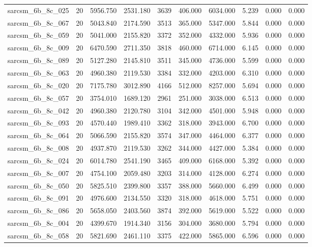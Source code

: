 \begin{tabular}{lrrrrrrrrr}
sarcsm\_6b\_8c\_025 & 20 & 5956.750 & 2531.180 & 3639 & 406.000 & 6034.000 & 5.239 & 0.000 & 0.000 \\
sarcsm\_6b\_8c\_067 & 20 & 5043.840 & 2174.590 & 3513 & 365.000 & 5347.000 & 5.844 & 0.000 & 0.000 \\
sarcsm\_6b\_8c\_059 & 20 & 5041.000 & 2155.820 & 3372 & 352.000 & 4332.000 & 5.936 & 0.000 & 0.000 \\
sarcsm\_6b\_8c\_009 & 20 & 6470.590 & 2711.350 & 3818 & 460.000 & 6714.000 & 6.145 & 0.000 & 0.000 \\
sarcsm\_6b\_8c\_089 & 20 & 5127.280 & 2145.810 & 3511 & 345.000 & 4736.000 & 5.599 & 0.000 & 0.000 \\
sarcsm\_6b\_8c\_063 & 20 & 4960.380 & 2119.530 & 3384 & 332.000 & 4203.000 & 6.310 & 0.000 & 0.000 \\
sarcsm\_6b\_8c\_020 & 20 & 7175.780 & 3012.890 & 4166 & 512.000 & 8257.000 & 5.694 & 0.000 & 0.000 \\
sarcsm\_6b\_8c\_057 & 20 & 3754.010 & 1689.120 & 2961 & 251.000 & 3038.000 & 6.513 & 0.000 & 0.000 \\
sarcsm\_6b\_8c\_042 & 20 & 4960.380 & 2120.780 & 3104 & 342.000 & 4501.000 & 5.948 & 0.000 & 0.000 \\
sarcsm\_6b\_8c\_093 & 20 & 4570.440 & 1989.410 & 3362 & 318.000 & 3943.000 & 6.700 & 0.000 & 0.000 \\
sarcsm\_6b\_8c\_064 & 20 & 5066.590 & 2155.820 & 3574 & 347.000 & 4464.000 & 6.377 & 0.000 & 0.000 \\
sarcsm\_6b\_8c\_008 & 20 & 4937.870 & 2119.530 & 3262 & 344.000 & 4427.000 & 5.384 & 0.000 & 0.000 \\
sarcsm\_6b\_8c\_024 & 20 & 6014.780 & 2541.190 & 3465 & 409.000 & 6168.000 & 5.392 & 0.000 & 0.000 \\
sarcsm\_6b\_8c\_007 & 20 & 4754.100 & 2059.480 & 3203 & 314.000 & 4128.000 & 6.274 & 0.000 & 0.000 \\
sarcsm\_6b\_8c\_050 & 20 & 5825.510 & 2399.800 & 3357 & 388.000 & 5660.000 & 6.499 & 0.000 & 0.000 \\
sarcsm\_6b\_8c\_091 & 20 & 4976.600 & 2134.550 & 3320 & 318.000 & 4618.000 & 5.751 & 0.000 & 0.000 \\
sarcsm\_6b\_8c\_086 & 20 & 5658.050 & 2403.560 & 3874 & 392.000 & 5619.000 & 5.522 & 0.000 & 0.000 \\
sarcsm\_6b\_8c\_004 & 20 & 4399.670 & 1914.340 & 3156 & 304.000 & 3680.000 & 5.794 & 0.000 & 0.000 \\
sarcsm\_6b\_8c\_058 & 20 & 5821.690 & 2461.110 & 3375 & 422.000 & 5865.000 & 6.596 & 0.000 & 0.000 \\

\end{tabular}

